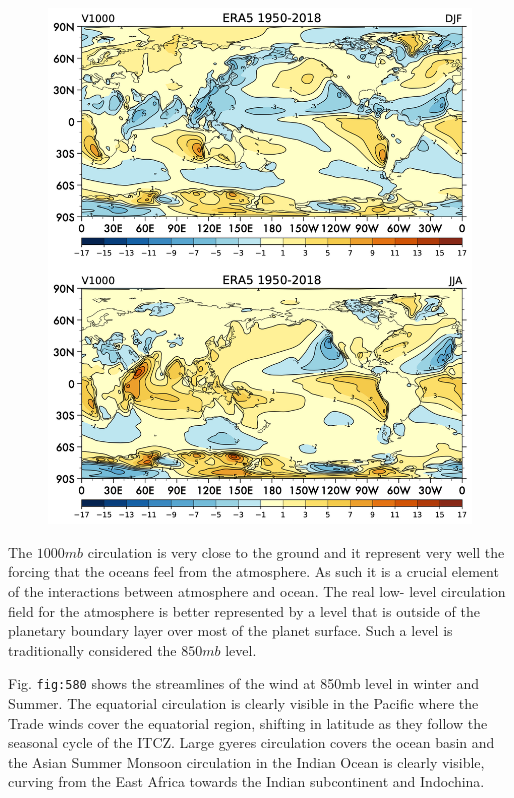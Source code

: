 \begin{figure}
\centering
\includegraphics[width = .7 \textwidth]{figs/GD/V1000.png}
\caption{}\label{}
\end{figure}

The \(1000mb\) circulation is very close to the ground and it represent
very well the forcing that the oceans feel from the atmosphere. As such
it is a crucial element of the interactions between atmosphere and
ocean. The real low- level circulation field for the atmosphere is
better represented by a level that is outside of the planetary boundary
layer over most of the planet surface. Such a level is traditionally
considered the \(850mb\) level.

Fig. \texttt{fig:580} shows the streamlines of the wind at 850mb level
in winter and Summer. The equatorial circulation is clearly visible in
the Pacific where the Trade winds cover the equatorial region, shifting
in latitude as they follow the seasonal cycle of the ITCZ. Large gyeres
circulation covers the ocean basin and the Asian Summer Monsoon
circulation in the Indian Ocean is clearly visible, curving from the
East Africa towards the Indian subcontinent and Indochina.

